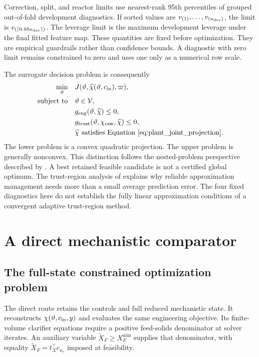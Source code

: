 Correction, split, and reactor limits use nearest-rank 95th percentiles of grouped out-of-fold development diagnostics. If sorted values are $v_{(1)},\ldots,v_{(n_{\rm dev})}$, the limit is $v_{(\lceil0.95n_{\rm dev}\rceil)}$. The leverage limit is the maximum development leverage under the final fitted feature map. These quantities are fixed before optimization. They are empirical guardrails rather than confidence bounds. A diagnostic with zero limit remains constrained to zero and uses one only as a numerical row scale.

The surrogate decision problem is consequently
\begin{equation}
\begin{aligned}
\min_{\vartheta}\quad&J(\vartheta,\widehat\chi(\vartheta,c_{\rm in}),\varpi),\\
\text{subject to}\quad&\vartheta\in\mathcal V,\\
&g_{\rm eng}(\vartheta,\widehat\chi)\le0,\\
&g_{\rm trust}(\vartheta,\chi_{\rm raw},\widehat\chi)\le0,\\
&\widehat\chi\text{ satisfies Equation~\eqref{eq:plant_joint_projection}}.
\end{aligned}
\label{eq:plant_surrogate_optimization}
\end{equation}
The lower problem is a convex quadratic projection. The upper problem is generally nonconvex. This distinction follows the nested-problem perspective described by \citet{Colson2007}. A best retained feasible candidate is not a certified global optimum. The trust-region analysis of \citet{Alexandrov1998} explains why reliable approximation management needs more than a small average prediction error. The four fixed diagnostics here do not establish the fully linear approximation conditions of a convergent adaptive trust-region method.

\section{A direct mechanistic comparator}

\subsection{The full-state constrained optimization problem}

The direct route retains the controls and full reduced mechanistic state. It reconstructs $\chi(\vartheta,c_{\rm in},y)$ and evaluates the same engineering objective. Its finite-volume clarifier equations require a positive feed-solids denominator at solver iterates. An auxiliary variable $\widetilde X_F\ge X_F^{\min}$ supplies that denominator, with equality $\widetilde X_F=t_X^\top c_{n_r}$ imposed at feasibility.

